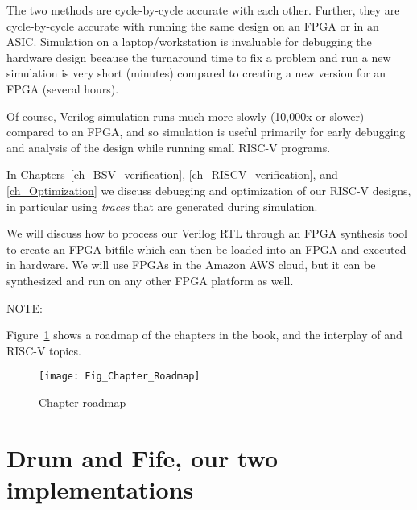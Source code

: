 The two methods are cycle-by-cycle accurate with each other.  Further,
they are cycle-by-cycle accurate with running the same design on an
FPGA or in an ASIC.  Simulation on a laptop/workstation is invaluable
for debugging the hardware design because the turnaround time to fix a
problem and run a new simulation is very short (minutes) compared to
creating a new version for an FPGA (several hours).

Of course, Verilog simulation runs much more slowly (10,000x or
slower) compared to an FPGA, and so simulation is useful primarily for
early debugging and analysis of the design while running small RISC-V
programs.

In Chapters~\ref{ch_BSV_verification}, \ref{ch_RISCV_verification},
and \ref{ch_Optimization} we discuss debugging and optimization of our
RISC-V designs, in particular using \emph{traces} that are generated
during simulation.

We will discuss how to process our Verilog RTL through an FPGA
synthesis tool to create an FPGA bitfile which can then be loaded into
an FPGA and executed in hardware.  We will use FPGAs in the Amazon AWS
cloud, but it can be synthesized and run on any other FPGA platform as
well.

\vspace{1ex}

NOTE: 

\vspace{1ex}

Figure~\ref{Fig_Chapter_Roadmap} shows a roadmap of the chapters in
the book, and the interplay of {\BSV} and RISC-V topics.
\begin{figure}[htbp]
  \centerline{\texttt{[image: Fig\_Chapter\_Roadmap]}}
  \caption{\label{Fig_Chapter_Roadmap}Chapter roadmap}
\end{figure}


\section{Drum and Fife, our two implementations}

